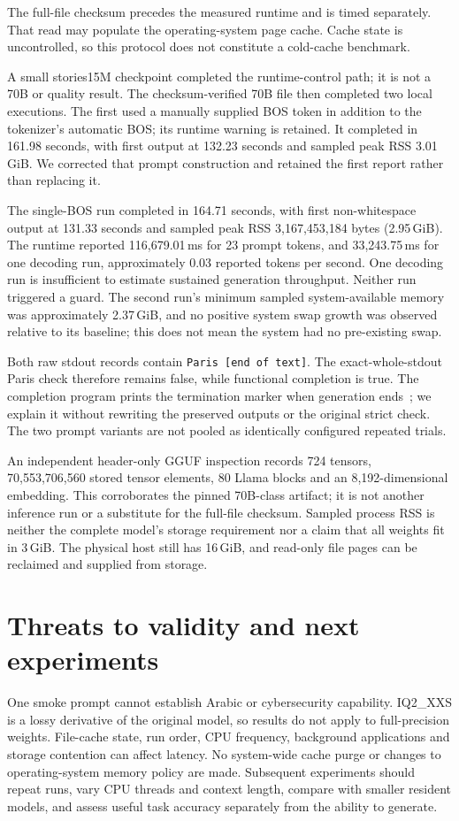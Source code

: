 \documentclass[11pt]{article}
\begin{document}
The full-file checksum precedes the measured runtime and is timed separately. That read may populate the operating-system page cache. Cache state is uncontrolled, so this protocol does not constitute a cold-cache benchmark.

A small stories15M checkpoint completed the runtime-control path; it is not a 70B or quality result. The checksum-verified 70B file then completed two local executions. The first used a manually supplied BOS token in addition to the tokenizer's automatic BOS; its runtime warning is retained. It completed in 161.98 seconds, with first output at 132.23 seconds and sampled peak RSS 3.01\,GiB. We corrected that prompt construction and retained the first report rather than replacing it.

The single-BOS run completed in 164.71 seconds, with first non-whitespace output at 131.33 seconds and sampled peak RSS 3,167,453,184 bytes (2.95\,GiB). The runtime reported 116,679.01\,ms for 23 prompt tokens, and 33,243.75\,ms for one decoding run, approximately 0.03 reported tokens per second. One decoding run is insufficient to estimate sustained generation throughput. Neither run triggered a guard. The second run's minimum sampled system-available memory was approximately 2.37\,GiB, and no positive system swap growth was observed relative to its baseline; this does not mean the system had no pre-existing swap.

Both raw stdout records contain \texttt{Paris [end of text]}. The exact-whole-stdout Paris check therefore remains false, while functional completion is true. The completion program prints the termination marker when generation ends~\cite{completion}; we explain it without rewriting the preserved outputs or the original strict check. The two prompt variants are not pooled as identically configured repeated trials.

An independent header-only GGUF inspection records 724 tensors, 70,553,706,560 stored tensor elements, 80 Llama blocks and an 8,192-dimensional embedding. This corroborates the pinned 70B-class artifact; it is not another inference run or a substitute for the full-file checksum. Sampled process RSS is neither the complete model's storage requirement nor a claim that all weights fit in 3\,GiB. The physical host still has 16\,GiB, and read-only file pages can be reclaimed and supplied from storage.

\section{Threats to validity and next experiments}
One smoke prompt cannot establish Arabic or cybersecurity capability. IQ2\_XXS is a lossy derivative of the original model, so results do not apply to full-precision weights. File-cache state, run order, CPU frequency, background applications and storage contention can affect latency. No system-wide cache purge or changes to operating-system memory policy are made. Subsequent experiments should repeat runs, vary CPU threads and context length, compare with smaller resident models, and assess useful task accuracy separately from the ability to generate.
\end{document}
